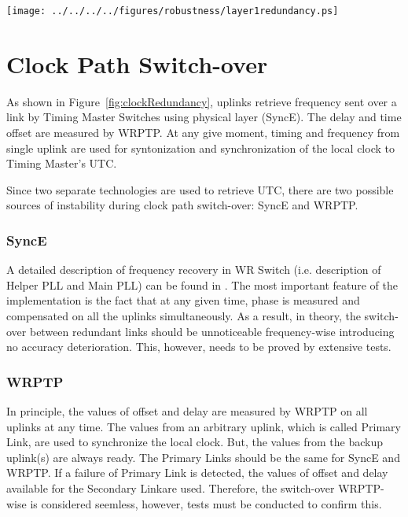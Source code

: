 \begin{center}
	\texttt{[image: ../../../../figures/robustness/layer1redundancy.ps]}
	\label{fig:clockRedundancy}
\end{center}

\section{Clock Path Switch-over}

As shown in Figure~\ref{fig:clockRedundancy}, uplinks retrieve frequency
sent over a link by Timing Master Switches using physical layer (SyncE). The
delay and time offset are measured by WRPTP. At any give moment,
timing and frequency from single uplink are used for syntonization and
synchronization of the local clock to Timing Master's UTC.

Since two separate technologies are used to retrieve UTC, there are two
possible sources of instability during clock path switch-over: SyncE and WRPTP.

\subsubsection{SyncE}

A detailed description of frequency recovery in WR Switch (i.e. description of
Helper PLL and Main PLL) can be found in \cite{TomekMSc}. The most important
feature of the implementation is the fact that at any given time, phase is
measured and compensated on all the uplinks simultaneously. As a result, in
theory, the switch-over between redundant links should be unnoticeable
frequency-wise introducing no accuracy deterioration. This, however, needs to be
proved by extensive tests.

\subsubsection{WRPTP} 

In principle, the values of offset and delay are measured by WRPTP on all
uplinks at any time. The values from an arbitrary uplink, which is called
Primary Link, are used to synchronize the local clock. But, the values from the
backup uplink(s) are always ready. The Primary Links should be the same
for SyncE and WRPTP. If a failure of Primary Link is detected, the values of
offset and delay available for the Secondary Linkare used. Therefore, the
switch-over WRPTP-wise is considered seemless, however, tests must be conducted
to confirm this.

